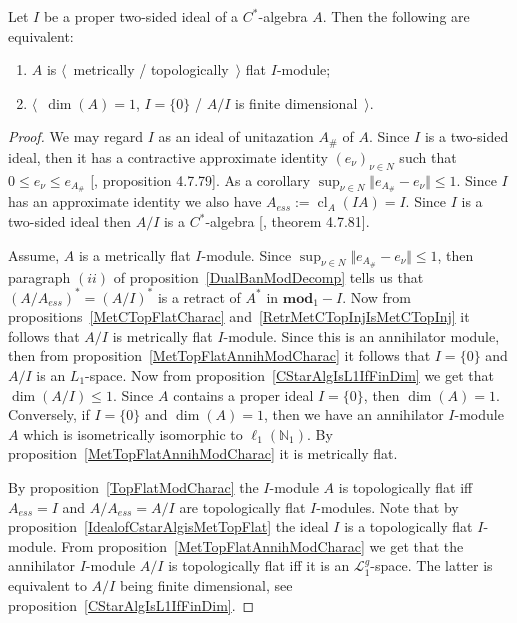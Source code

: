 \begin{proposition}\label{CStarAlgIsTopFlatOverItsIdeal} Let $I$ be a proper
two-sided ideal of a  $C^*$-algebra $A$. Then the following are equivalent:

\begin{enumerate}[label = (\roman*)]
    \item $A$ is $\langle$~metrically / topologically~$\rangle$ flat $I$-module;

    \item $\langle$~$\operatorname{dim}(A)=1$, $I= \{0 \}$ / $A/I$ is finite
    dimensional~$\rangle$.
\end{enumerate}
\end{proposition}
\begin{proof} We may regard $I$ as an  ideal of unitazation $A_\#$ of $A$. Since
$I$ is a two-sided ideal, then it has a contractive approximate identity
${(e_\nu)}_{\nu\in N}$ such that $0\leq e_\nu\leq e_{A_\#}$
[\cite{HelBanLocConvAlg}, proposition 4.7.79]. As a 
corollary $\sup_{\nu\in N}\Vert e_{A_\#}-e_\nu\Vert\leq 1$. Since $I$ has an 
approximate identity we also have $A_{ess}:=\operatorname{cl}_A(IA)=I$. 
Since $I$ is a two-sided ideal then $A/I$ is a $C^*$-algebra 
[\cite{HelBanLocConvAlg}, theorem 4.7.81].

Assume, $A$ is a metrically flat $I$-module. Since 
$\sup_{\nu\in N}\Vert e_{A_\#}-e_\nu\Vert\leq 1$, then paragraph $(ii)$ of
proposition~\ref{DualBanModDecomp} tells us that ${(A/A_{ess})}^*={(A/I)}^*$ is 
a retract of $A^*$ in $\mathbf{mod}_1-I$. Now from
propositions~\ref{MetCTopFlatCharac} and~\ref{RetrMetCTopInjIsMetCTopInj} it
follows that $A/I$ is metrically flat $I$-module. Since this is an annihilator
module, then from proposition~\ref{MetTopFlatAnnihModCharac} it follows that 
$I= \{0 \}$ and $A/I$ is an $L_1$-space. Now from
proposition~\ref{CStarAlgIsL1IfFinDim} we get that 
$\operatorname{dim}(A/I)\leq 1$. Since $A$ contains a proper 
ideal $I= \{0 \}$, then $\operatorname{dim}(A)=1$. Conversely, 
if $I= \{0 \}$ and $\operatorname{dim}(A)=1$, then we have an 
annihilator $I$-module $A$ which is isometrically isomorphic 
to $\ell_1(\mathbb{N}_1)$. By proposition~\ref{MetTopFlatAnnihModCharac} 
it is metrically flat. 

By proposition~\ref{TopFlatModCharac} the $I$-module $A$ is topologically flat
iff $A_{ess}=I$ and $A/A_{ess}=A/I$ are topologically flat $I$-modules. Note that by
proposition~\ref{IdealofCstarAlgisMetTopFlat} the ideal $I$ is a topologically
flat $I$-module. From proposition~\ref{MetTopFlatAnnihModCharac} we get that the 
annihilator $I$-module $A/I$ is topologically flat iff it is an $\mathscr{L}_1^g$-space. 
The latter is equivalent to $A/I$ being finite dimensional, see 
proposition~\ref{CStarAlgIsL1IfFinDim}.
\end{proof}

